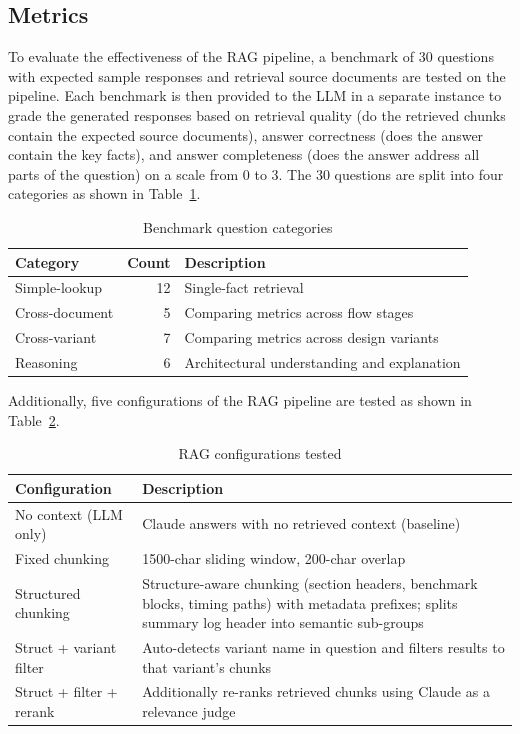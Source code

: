 \documentclass[conference]{IEEEtran}
\begin{document}
\subsection{Metrics}

To evaluate the effectiveness of the RAG pipeline, a benchmark of 30 questions with expected sample responses and retrieval source documents are tested on the pipeline. Each benchmark is then provided to the LLM in a separate instance to grade the generated responses based on retrieval quality (do the retrieved chunks contain the expected source documents), answer correctness (does the answer contain the key facts), and answer completeness (does the answer address all parts of the question) on a scale from 0 to 3. The 30 questions are split into four categories as shown in Table~\ref{tab:benchmark_categories}.

\begin{table}[h]
\centering
\caption{Benchmark question categories}
\begin{tabular}{lrl}
\hline
\textbf{Category} & \textbf{Count} & \textbf{Description} \\
\hline
Simple-lookup    & 12 & Single-fact retrieval \\
Cross-document   &  5 & Comparing metrics across flow stages \\
Cross-variant    &  7 & Comparing metrics across design variants \\
Reasoning        &  6 & Architectural understanding and explanation \\
\hline
\end{tabular}
\label{tab:benchmark_categories}
\end{table}

Additionally, five configurations of the RAG pipeline are tested as shown in Table~\ref{tab:rag_configs}.

\begin{table}[h]
\centering
\caption{RAG configurations tested}
\begin{tabular}{lp{5cm}}
\hline
\textbf{Configuration} & \textbf{Description} \\
\hline
No context (LLM only)       & Claude answers with no retrieved context (baseline) \\
Fixed chunking              & 1500-char sliding window, 200-char overlap \\
Structured chunking         & Structure-aware chunking (section headers, benchmark blocks, timing paths) with metadata prefixes; splits summary log header into semantic sub-groups \\
Struct + variant filter     & Auto-detects variant name in question and filters results to that variant's chunks \\
Struct + filter + rerank    & Additionally re-ranks retrieved chunks using Claude as a relevance judge \\
\hline
\end{tabular}
\label{tab:rag_configs}
\end{table}
\end{document}
